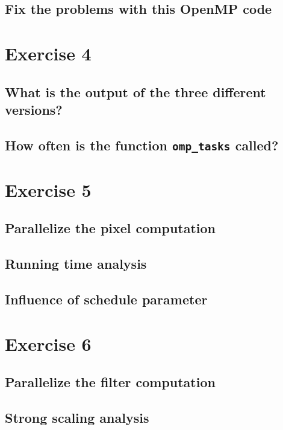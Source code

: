 \documentclass[a4paper,%
11pt,%
DIV12,
headsepline,%
headings=normal,
]{scrartcl}
\begin{document}
\subsection{Fix the problems with this OpenMP code}

\section{Exercise 4}

\subsection{What is the output of the three different versions?}

\subsection{How often is the function \texttt{omp\_tasks} called?}

\section{Exercise 5}

\subsection{Parallelize the pixel computation}

\subsection{Running time analysis}

\subsection{Influence of schedule parameter}

\section{Exercise 6}

\subsection{Parallelize the filter computation}

\subsection{Strong scaling analysis}
\end{document}
